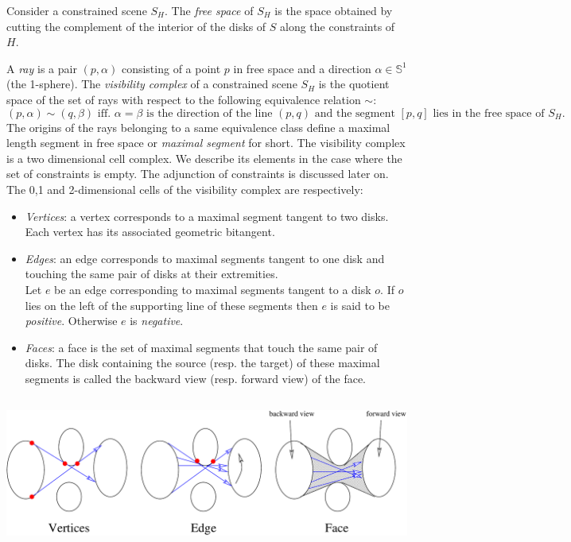 Consider a constrained scene $S_H$. The \emph{free space} of $S_H$ is the
space obtained by cutting the complement of the interior of the disks of $S$
along the constraints of $H$.

A \emph{ray} is a pair $(p,\alpha)$ consisting of a point $p$ in free space
and a direction $\alpha \in \mathbb{S}^1$ (the 1-sphere).  The
\emph{visibility complex} of a constrained scene $S_H$ is the quotient
space of the set of rays with respect to the following equivalence relation
$\sim$:
\begin{equation}
(p,\alpha) \sim (q,\beta) \textrm{ iff. } \alpha = \beta \textrm{ is the
direction of the line $(p,q)$ and the segment } [p,q] \textrm{ lies in the
free space of } S_H.
\end{equation}
The origins of the rays belonging to a same equivalence class define a
maximal length segment in free space or \emph{maximal segment} for short.
The visibility complex is a two dimensional cell complex. We describe its
elements in the case where the set of constraints is empty. The adjunction
of constraints is discussed later on. The 0,1 and 2-dimensional cells of
the visibility complex are respectively:
\begin{itemize}
    \item \emph{Vertices}: a vertex corresponds to a maximal segment tangent to
    two disks. Each vertex has its associated geometric bitangent.
    \item \emph{Edges}: an edge corresponds to maximal segments tangent to
    one disk and touching the same pair of disks at their extremities. \\
    Let $e$ be an edge corresponding to maximal segments tangent to a disk
    $o$.  If $o$ lies on the left of the supporting line of these segments
    then $e$ is said to be \emph{positive}. Otherwise $e$ is
    \emph{negative}.
    \item \emph{Faces}: a face is the set of maximal segments that touch the
    same pair of disks. The disk containing the source (resp. the target) of 
    these maximal segments is called the backward view (resp. forward view) of 
    the face.
\end{itemize}

\begin{ccTexOnly}
    \begin{center}
        \includegraphics[height=5cm,width=\linewidth]{Visibility_complex/fig/vis-complex}%
    \end{center}
\end{ccTexOnly}

